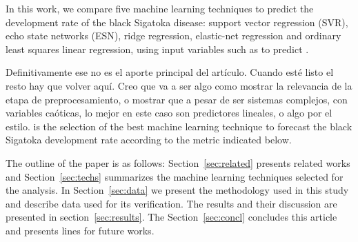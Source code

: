 
In this work, we compare five machine learning techniques to predict
the development rate of the black Sigatoka disease: support vector
regression (SVR), echo state networks (ESN), ridge regression,
elastic-net regression and ordinary least squares linear regression,
using input variables such as  to predict .

%
{Definitivamente ese no es el aporte principal del artículo.  Cuando
  esté listo el resto hay que volver aquí.  Creo que va a ser algo
  como mostrar la relevancia de la etapa de preprocesamiento, o
  mostrar que a pesar de ser sistemas complejos, con variables
  caóticas, lo mejor en este caso son predictores lineales, o algo por
  el estilo.} %
% 
 is the selection of the best machine learning technique
to forecast the black Sigatoka development rate according to the
metric indicated below.

The outline of the paper is as follows: Section~\ref{sec:related}
presents related works and Section~\ref{sec:techs} summarizes the
machine learning techniques selected for the analysis. In
Section~\ref{sec:data} we present the methodology used in this study
and describe data used for its verification.  The results and their
discussion are presented in section~\ref{sec:results}.  The
Section~\ref{sec:concl} concludes this article and presents lines for
future works.

